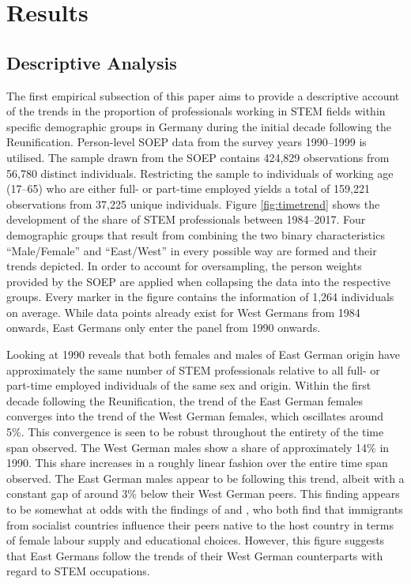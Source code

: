\documentclass[a4paper, oneside, hyperfootnotes = false]{article}
\begin{document}
{\section{Results}
\label{results}

\subsection{Descriptive Analysis}
\label{descriptives}

The first empirical subsection of this paper aims to provide a descriptive account of the trends in the proportion of professionals working in STEM fields within specific demographic groups in Germany during the initial decade following the Reunification.
Person-level SOEP data from the survey years 1990--1999 is utilised.
The sample drawn from the SOEP contains 424,829 observations from 56,780 distinct individuals.
Restricting the sample to individuals of working age (17--65) who are either full- or part-time employed yields a total of 159,221 observations from 37,225 unique individuals.
Figure \ref{fig:timetrend} shows the development of the share of STEM professionals between 1984--2017.
Four demographic groups that result from combining the two binary characteristics ``Male/Female'' and ``East/West'' in every possible way are formed and their trends depicted.
In order to account for oversampling, the person weights provided by the SOEP are applied when collapsing the data into the respective groups.
Every marker in the figure contains the information of 1,264 individuals on average.
While data points already exist for West Germans from 1984 onwards, East Germans only enter the panel from 1990 onwards.

Looking at 1990 reveals that both females and males of East German origin have approximately the same number of STEM professionals relative to all full- or part-time employed individuals of the same sex and origin.
Within the first decade following the Reunification, the trend of the East German females converges into the trend of the West German females, which oscillates around 5\%.
This convergence is seen to be robust throughout the entirety of the time span observed.
The West German males show a share of approximately 14\% in 1990.
This share increases in a roughly linear fashion over the entire time span observed.
The East German males appear to be following this trend, albeit with a constant gap of around 3\% below their West German peers.
This finding appears to be somewhat at odds with the findings of \cite{Jessen2023} and \cite{FriedmanSokuler2020}, who both find that immigrants from socialist countries influence their peers native to the host country in terms of female labour supply and educational choices.
However, this figure suggests that East Germans follow the trends of their West German counterparts with regard to STEM occupations.

}
\end{document}
